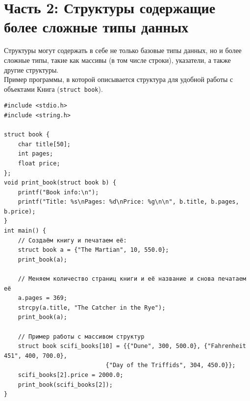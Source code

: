 \documentclass{article}
\begin{document}
\section*{Часть 2: Структуры содержащие более сложные типы данных}
Структуры могут содержать в себе не только базовые типы данных, но и более сложные типы, такие как массивы (в том числе строки), указатели, а также другие структуры.\\
Пример программы, в которой описывается структура для удобной работы с объектами Книга (\texttt{struct book}).
\begin{lstlisting}
#include <stdio.h>
#include <string.h>

struct book {
    char title[50];
    int pages;
    float price;
};
void print_book(struct book b) {
    printf("Book info:\n");
    printf("Title: %s\nPages: %d\nPrice: %g\n\n", b.title, b.pages, b.price);
}
int main() {
    // Создаём книгу и печатаем её:
    struct book a = {"The Martian", 10, 550.0};
    print_book(a);
    
    // Меняем количество страниц книги и её название и снова печатаем её
    a.pages = 369;
    strcpy(a.title, "The Catcher in the Rye");
    print_book(a);
    
    // Пример работы с массивом структур
    struct book scifi_books[10] = {{"Dune", 300, 500.0}, {"Fahrenheit 451", 400, 700.0},
							 {"Day of the Triffids", 304, 450.0}};
    scifi_books[2].price = 2000.0;
    print_book(scifi_books[2]);
}
\end{lstlisting}
\end{document}
